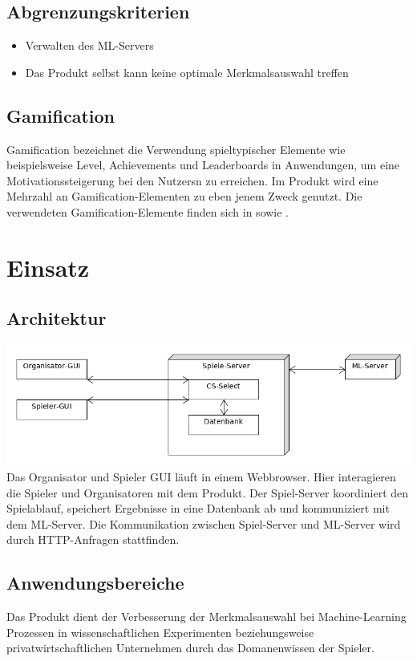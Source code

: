 \documentclass[a4paper]{scrreprt}
\begin{document}
    \section{Abgrenzungskriterien}
    \begin{itemize}
        \item Verwalten des \Gls{ML-Server}s
	    \item Das Produkt selbst kann keine optimale Merkmalsauswahl treffen
    \end{itemize}

    \section{Gamification}
    \label{sec:gamification}
    Gamification bezeichnet die Verwendung spieltypischer Elemente wie beispielsweise Level, Achievements und Leaderboards in Anwendungen, um eine Motivationssteigerung bei den \Glspl{Nutzer}n zu erreichen.
    Im \Gls{Produkt} wird eine Mehrzahl an Gamification-Elementen zu eben jenem Zweck genutzt.
    Die verwendeten Gamification-Elemente finden sich in  sowie .

    
    \chapter{Einsatz}

    \section{Architektur}
    \includegraphics[width=\textwidth]{uml/export/Architektur.png}
    Das Organisator und Spieler GUI läuft in einem \Gls{Webbrowser}.
    Hier interagieren die Spieler und Organisatoren mit dem \Gls{Produkt}.
    Der \Gls{Spiel-Server} koordiniert den Spielablauf, speichert Ergebnisse
    in eine Datenbank ab und kommuniziert mit dem ML-Server.
    Die Kommunikation zwischen \Gls{Spiel-Server} und ML-Server wird durch HTTP-Anfragen stattfinden.
    \section{Anwendungsbereiche}
    Das \Gls{Produkt} dient der Verbesserung der Merkmalsauswahl bei Machine-Learning Prozessen in wissenschaftlichen
    Experimenten beziehungsweise privatwirtschaftlichen Unternehmen durch das \Gls{Domanenwissen} der \Gls{Spieler}.
\end{document}
